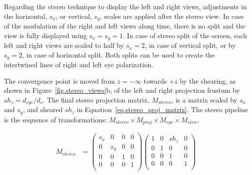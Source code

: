 Regarding the stereo technique to display the left and right views, adjustments in the horizontal, $s_x$, or vertical, $s_y$, scales are applied after the stereo view. In case of the modulation of the right and left views along time, there is no split and the view is fully displayed using  $s_x = s_y = 1$. In case of stereo split of the screen, each left and right views are scaled to half by $s_x = 2$, in case of vertical split, or by $s_y = 2$, in case of horizontal split. Both splits can be used to create the intertwined lines of right and left eye polarization.  

The convergence point is moved from $z=-\infty$ towards $+z$ by the shearing, as shown in Figure~\ref{fig.stereo_views}b, of the left and right projection frustum by $sh_z = d_{eye}/d_{s}$. The final stereo projection matrix, $M_{stereo}$, is a matrix scaled by $s_x$ and $s_y$, and sheared $sh_z$ in Equation~\ref{eq.stereo_proj_matrix}. The stereo pipeline is the sequence of transformations: $M_{stereo} \times M_{proj} \times M_{eye} \times M_{view}$.

\begin{equation}
\begin{aligned}
M_{stereo} &= 
\begin{pmatrix} 
s_x & 0 & 0 & 0\\
0 & s_y & 0 & 0\\
0 & 0   & 1 & 0\\
0 & 0   & 0 & 1\\
\end{pmatrix}
\begin{pmatrix} 
1 & 0 & sh_z & 0\\
0 & 1 & 0 & 0\\
0 & 0 & 1 & 0\\
0 & 0 & 0 & 1\\
\end{pmatrix}
\end{aligned}
\label{eq.stereo_proj_matrix}
\end{equation}

 